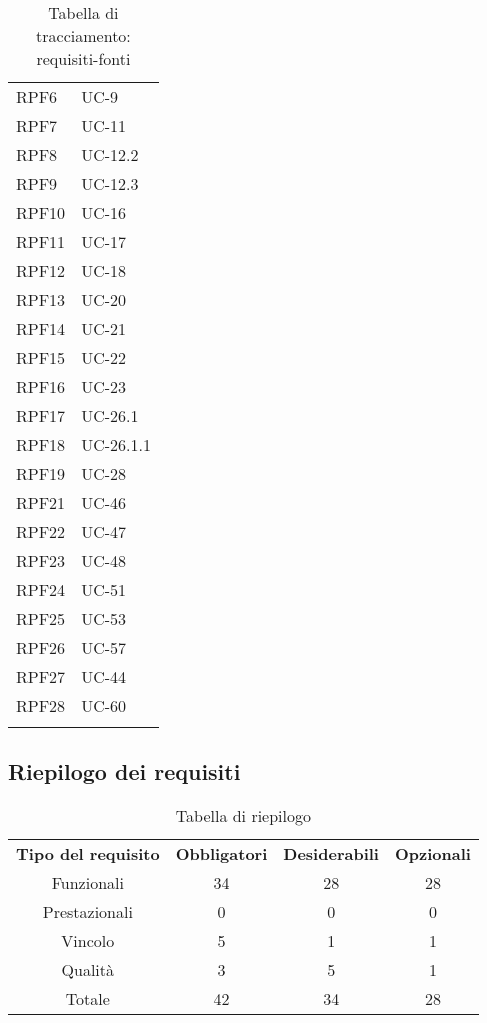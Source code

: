\begin{longtable}{| p{5cm} | p{5cm} |}
		RPF6 & UC-9\\
		\rowcolor{LightGray}
		RPF7 & UC-11\\
		RPF8 & UC-12.2\\
		\rowcolor{LightGray}
		RPF9 & UC-12.3\\
		RPF10 & UC-16\\
		\rowcolor{LightGray}
		RPF11 & UC-17\\
		RPF12 & UC-18\\
		\rowcolor{LightGray}
		RPF13 & UC-20\\
		RPF14 & UC-21\\
		\rowcolor{LightGray}
		RPF15 & UC-22\\
		RPF16 & UC-23\\
		\rowcolor{LightGray}
		RPF17 & UC-26.1\\
		RPF18 & UC-26.1.1\\
		\rowcolor{LightGray}
		RPF19 & UC-28\\
		\rowcolor{LightGray}
		RPF21 & UC-46\\
		RPF22 & UC-47\\
		\rowcolor{LightGray}
		RPF23 & UC-48\\
		RPF24 & UC-51\\
		\rowcolor{LightGray}
		RPF25 & UC-53\\
		RPF26 & UC-57\\	
		\rowcolor{LightGray}
		RPF27 & UC-44\\
		RPF28 & UC-60\\
		\rowcolor{LightGray}
		\hline
		\caption{Tabella di tracciamento: requisiti-fonti}
\end{longtable}

\subsection{Riepilogo dei requisiti}
\begin{table}[h]
\centering
\begin{tabular}{| c | c | c | c |}
		\rowcolor{LightBlue}
		\color{white}\bfseries Tipo del requisito & \color{white}\bfseries Obbligatori & \color{white}\bfseries Desiderabili & \color{white}\bfseries Opzionali \\[0.25cm]
		 Funzionali & 34 & 28 & 28 \\
		 Prestazionali & 0 & 0 & 0 \\
		 Vincolo & 5 & 1 & 1 \\
		 Qualità & 3 & 5 & 1 \\
		 Totale & 42 & 34 & 28 \\ \hline
\end{tabular}
		\caption{Tabella di riepilogo}
\end{table}


\newpage